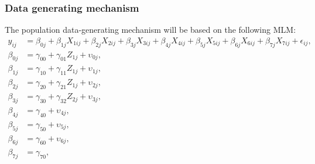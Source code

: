 \documentclass[10pt, a4paper, titlepage]{article}
\begin{document}
\subsubsection{Data generating mechanism}
The population data-generating mechanism will be based on the following MLM:
\begin{subequations}
\label{eq:population}
\begin{align}
y_{ij} &= \beta_{0j} + \beta_{1j}X_{1ij} + \beta_{2j}X_{2ij} + \beta_{3j}X_{3ij} + \beta_{4j}X_{4ij} + \beta_{5j}X_{5ij} + \beta_{6j}X_{6ij} + \beta_{7j}X_{7ij} + \epsilon_{ij}, \tag{4} \\
\beta_{0j} &= \gamma_{00} + \gamma_{01}Z_{1j} + \upsilon_{0j}, \tag{4.1} \\
\beta_{1j} &= \gamma_{10} + \gamma_{11}Z_{1j} + \upsilon_{1j}, \tag{4.2} \\
\beta_{2j} &= \gamma_{20} + \gamma_{21}Z_{1j} + \upsilon_{2j}, \tag{4.3} \\
\beta_{3j} &= \gamma_{30} + \gamma_{32}Z_{2j} + \upsilon_{3j}, \tag{4.4} \\
\beta_{4j} &= \gamma_{40} + \upsilon_{4j}, \tag{4.5} \\
\beta_{5j} &= \gamma_{50} + \upsilon_{5j}, \tag{4.6} \\
\beta_{6j} &= \gamma_{60} + \upsilon_{6j}, \tag{4.7} \\
\beta_{7j} &= \gamma_{70}, \tag{4.8}
\end{align}
\end{subequations}
\end{document}
